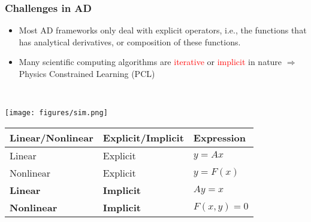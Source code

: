 \documentclass[usenames,dvipsnames]{beamer}
\begin{document}
\begin{frame}


	\frametitle{Challenges in AD}
	
	
	\begin{minipage}[t]{0.49\textwidth}
	\vspace{-3cm}
\begin{itemize}
	\item Most AD frameworks only deal with explicit operators, i.e., the functions that has analytical derivatives, or composition of these functions. 
	\item Many scientific computing algorithms are \textcolor{red}{iterative} or \textcolor{red}{implicit} in nature $\Rightarrow$ Physics Constrained Learning (PCL)
\end{itemize}
\end{minipage}~
\begin{minipage}[t]{0.49\textwidth}
  \texttt{[image: figures/sim.png]}
\end{minipage}

\begin{table}[]
\begin{tabular}{@{}lll@{}}
\toprule
Linear/Nonlinear & Explicit/Implicit & Expression   \\ \midrule
Linear           & Explicit          & $y=Ax$       \\
Nonlinear        & Explicit          & $y = F(x)$   \\
\textbf{Linear}           & \textbf{Implicit}          & $Ay = x$     \\
\textbf{Nonlinear}        & \textbf{Implicit}          & $F(x,y) = 0$ \\ \bottomrule
\end{tabular}
\end{table}
\end{frame}
\end{document}
